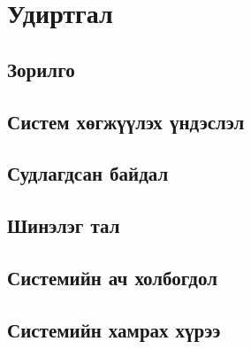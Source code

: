
\section{Удиртгал}

    \subsection{Зорилго}

    \subsection{Систем хөгжүүлэх үндэслэл}
    
    \subsection{Судлагдсан байдал}

    \subsection{Шинэлэг тал}

    \subsection{Системийн ач холбогдол}

    \subsection{Системийн хамрах хүрээ}
